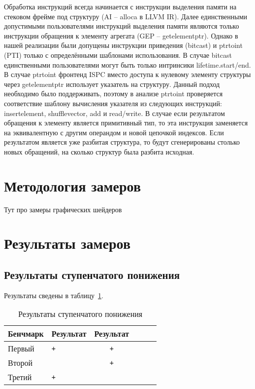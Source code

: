 Обработка инструкций всегда начинается с инструкции выделения памяти на стековом фрейме под структуру (AI -- alloca в LLVM IR).
Далее единственными допустимыми пользователями инструкций выделения памяти являются только инструкции обращения к элементу агрегата (GEP -- getelementptr).
Однако в нашей реализации были допущены инструкции приведения (bitcast) и ptrtoint (PTI) только с определёнными шаблонами использования.
В случае bitcast единственными пользователями могут быть только интринсики lifetime.start/end.
В случае ptrtoint фронтенд ISPC вместо доступа к нулевому элементу структуры через getelementptr использует указатель на структуру.
Данный подход необходимо было поддерживать, поэтому в анализе ptrtoint проверяется соответствие шаблону вычисления указателя из следующих инструкций: insertelement, shufflevector, add и read/write.
В случае если результатом обращения к элементу является примитивный тип, то эта инструкция заменяется на эквивалентную с другим операндом и новой цепочкой индексов.
Если результатом является уже разбитая структура, то будут сгенерированы столько новых обращений, на сколько структур была разбита исходная.


\section{Методология замеров}\label{sec:results/measures}

Тут про замеры графических шейдеров

\section{Результаты замеров}\label{sec:results/results}

\subsection{Результаты ступенчатого понижения}\label{subsec:results/results/lowering}

Результаты сведены в таблицу~\cref{tab:results/lowering}.

\begin{table}
    \centering
    \captionsetup{justification=centering}
    \caption{Результаты ступенчатого понижения}\label{tab:results/lowering}
    \begin{tabular}{llc|llc}
        \toprule
        Бенчмарк & Результат & Результат \\
        \midrule
        Первый   & \verb|+|  & \verb|+|  \\
        Второй   & \verb| |  & \verb|+|  \\
        Третий   & \verb|+|  & \verb| |  \\
        \bottomrule
    \end{tabular}
\end{table}

